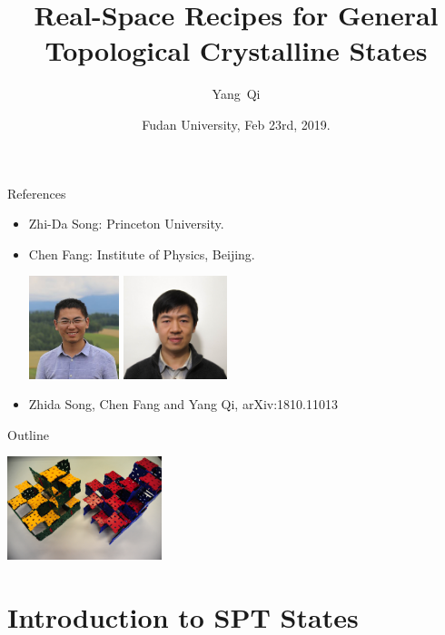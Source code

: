 \documentclass[xcolor=table, 11pt, aspectratio=43]{beamer}
\title[Space-group SPTs] %
{Real-Space Recipes for General Topological Crystalline States}
\author[Y Qi] %
{Yang~Qi}
\institute[Fudan] %
{Department of Physics, Fudan University}
\date{Fudan University, Feb 23rd, 2019.}
\begin{document}
\begin{frame}
  \titlepage
\end{frame}

\begin{frame}{References}
\begin{itemize}
\item Zhi-Da Song: Princeton University.
\item Chen Fang: Institute of Physics, Beijing.
\begin{center}
	\includegraphics[height=3cm]{../people/zhidasong}
	\includegraphics[height=3cm]{../people/chenfang}
\end{center}
\item Zhida Song, Chen Fang and Yang Qi, arXiv:1810.11013
\end{itemize}
\end{frame}

\begin{frame}{Outline}
	\tableofcontents
		\begin{center}
			\includegraphics[height=3cm]{toys}
		\end{center}
\end{frame}


\section{Introduction to SPT States}
\end{document}
